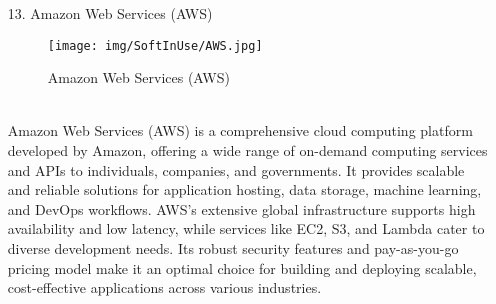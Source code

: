 \documentclass[conference]{IEEEtran}
\begin{document}
\begin{enumerate}
\item[13.] Amazon Web Services (AWS)
\begin{figure}[h]
\hspace{1cm}
\centering
\begin{minipage}{0.5\columnwidth}
    \texttt{[image: img/SoftInUse/AWS.jpg]}
    \caption{Amazon Web Services (AWS)}
\end{minipage}
\end{figure}\\
Amazon Web Services (AWS) is a comprehensive cloud computing platform developed by Amazon, offering a wide range of on-demand computing services and APIs to individuals, companies, and governments. It provides scalable and reliable solutions for application hosting, data storage, machine learning, and DevOps workflows. AWS's extensive global infrastructure supports high availability and low latency, while services like EC2, S3, and Lambda cater to diverse development needs. Its robust security features and pay-as-you-go pricing model make it an optimal choice for building and deploying scalable, cost-effective applications across various industries.

\clearpage

\end{enumerate}
\end{document}
